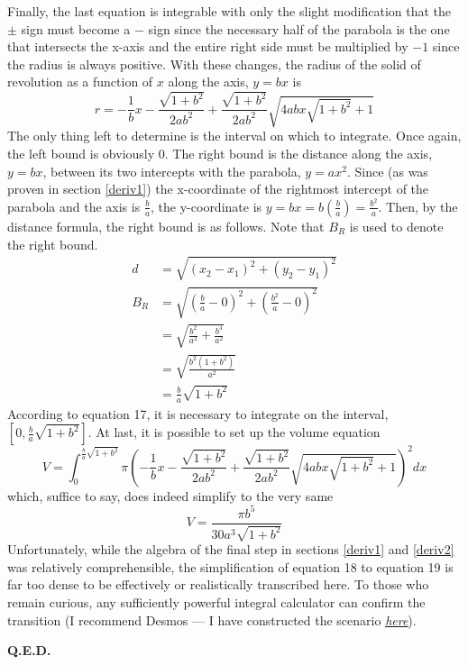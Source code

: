 \documentclass{article}
\begin{document}
Finally, the last equation is integrable with only the slight modification that the $\pm$ sign must become a $-$ sign since the necessary half of the parabola is the one that intersects the x-axis and the entire right side must be multiplied by $-1$ since the radius is always positive. With these changes, the radius of the solid of revolution as a function of $x$ along the axis, $y=bx$ is
\begin{equation*}
r=-\frac{1}{b}x-\frac{\sqrt{1+b^2}}{2ab^2}+\frac{\sqrt{1+b^2}}{2ab^2}\sqrt{4abx\sqrt{1+b^2}+1}\tag{16}
\end{equation*}
The only thing left to determine is the interval on which to integrate. Once again, the left bound is obviously $0$. The right bound is the distance along the axis, $y=bx$, between its two intercepts with the parabola, $y=ax^2$. Since (as was proven in section \ref{deriv1}) the x-coordinate of the rightmost intercept of the parabola and the axis is $\frac{b}{a}$, the y-coordinate is $y=bx=b\left(\frac{b}{a}\right)=\frac{b^2}{a}$. Then, by the distance formula, the right bound is as follows. Note that $B_R$ is used to denote the right bound.
\begin{align*}
d &= \sqrt{\left(x_2-x_1\right)^2+\left(y_2-y_1\right)^2}\\
B_R &= \sqrt{\left(\frac{b}{a}-0\right)^2+\left(\frac{b^2}{a}-0\right)^2}\\
        &= \sqrt{\frac{b^2}{a^2}+\frac{b^4}{a^2}}\\
        &= \sqrt{\frac{b^2(1+b^2)}{a^2}}\\
        &= \frac{b}{a}\sqrt{1+b^2}\tag{17}
\end{align*}
According to equation 17, it is necessary to integrate on the interval, $\left[0,\frac{b}{a}\sqrt{1+b^2}\right]$. At last, it is possible to set up the volume equation
\begin{equation*}
V=\int_0^{\frac{b}{a}\sqrt{1+b^2}}\pi\left(-\frac{1}{b}x-\frac{\sqrt{1+b^2}}{2ab^2}+\frac{\sqrt{1+b^2}}{2ab^2}\sqrt{4abx\sqrt{1+b^2}+1}\right)^2dx\tag{18}
\end{equation*}
which, suffice to say, does indeed simplify to the very same
\begin{equation*}
V=\frac{\pi b^5}{30a^3\sqrt{1+b^2}}\tag{19}
\end{equation*}
Unfortunately, while the algebra of the final step in sections \ref{deriv1} and \ref{deriv2} was relatively comprehensible, the simplification of equation 18 to equation 19 is far too dense to be effectively or realistically transcribed here. To those who remain curious, any sufficiently powerful integral calculator can confirm the transition (I recommend Desmos --- I have constructed the scenario \textcolor{blue}{\underline{\emph{\href{https://www.desmos.com/calculator/ssaa0mva1t}{here}}}}).
\begin{flushright}
\textbf{Q.E.D.}
\end{flushright}
\end{document}
